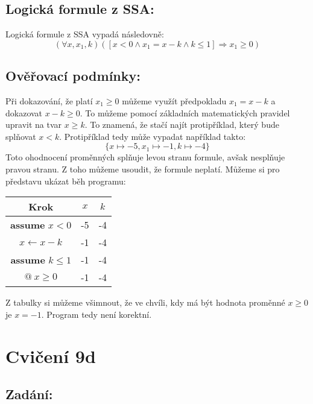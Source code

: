 \documentclass{article}
\begin{document}
\subsection{Logická formule z SSA:}
Logická formule z SSA vypadá následovně:
$$ (\forall x, x_1, k)([x < 0 \wedge x_1 = x - k \wedge k \leq 1] \Rightarrow x_1 \geq 0) $$

\subsection{Ověřovací podmínky:}

Při dokazování, že platí $x_1 \geq 0$ můžeme využít předpokladu $x_1 = x - k$ a dokazovat $ x - k \geq 0$. To můžeme pomocí základních matematických pravidel upravit na tvar $x \geq k$. To znamená, že stačí najít protipříklad, který bude splňovat $ x < k$. Protipříklad tedy může vypadat například takto:
$$\{x \mapsto -5, x_1 \mapsto -1, k \mapsto -4 \}$$
Toto ohodnocení proměnných splňuje levou stranu formule, avšak nesplňuje pravou stranu. Z toho můžeme usoudit, že formule neplatí. Můžeme si pro představu ukázat běh programu:

\begin{table}[H]\centering

\begin{tabular}{|c|c|c|}
    
        \hline \textbf{Krok} & $x$ & $k$ \\ \hline \hline
    	\textbf{assume} $x < 0$ & -5 & -4 \\  \hline
    	 $x \leftarrow x - k$ & -1 & -4 \\ \hline
    	 \textbf{assume} $k \leq 1$ & -1 & -4 \\ \hline
    	 $@ \ x \geq 0$ & -1 & -4 \\ \hline
    	
    	\end{tabular}
\end{table}

Z tabulky si můžeme všimnout, že ve chvíli, kdy má být hodnota proměnné $x \geq 0$ je $x = -1$. Program tedy není korektní.

\section{Cvičení 9d}

\subsection{Zadání:}
\end{document}
